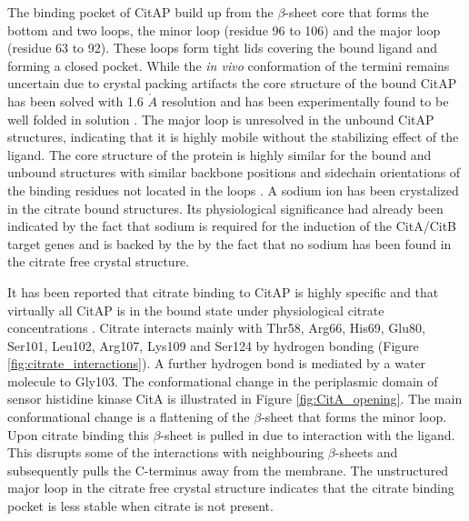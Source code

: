 \documentclass[english, a4paper, 12pt, titlepage, draft]{article}
\begin{document}
The binding pocket of CitAP build up from the $\beta$-sheet core that forms the bottom and two loops, the minor loop (residue 96 to 106) and the major loop (residue 63 to 92).
These loops form tight lids covering the bound ligand and forming a closed pocket.
While the \textit{in vivo} conformation of the termini remains uncertain due to crystal packing artifacts the core structure of the bound CitAP has been solved with 1.6 $\mathring{A}$ resolution and has been experimentally found to be well folded in solution \cite{CitA_2J80}.
The major loop is unresolved in the unbound CitAP structures, indicating that it is highly mobile without the stabilizing effect of the ligand.
The core structure of the protein is highly similar for the bound and unbound structures with similar backbone positions and sidechain orientations of the binding residues not located in the loops \cite{CitA_2J80}.
A sodium ion has been crystalized in the citrate bound structures.
Its physiological significance had already been indicated by the fact that sodium is required for the induction of the CitA/CitB target genes \cite{KlebsiellaMetabolism} and is backed by the by the fact that no sodium has been found in the citrate free crystal structure.

It has been reported that citrate binding to CitAP is highly specific and that virtually all CitAP is in the bound state under physiological citrate concentrations \cite{CitA_2J80}.
Citrate interacts mainly with Thr58, Arg66, His69, Glu80, Ser101, Leu102, Arg107, Lys109 and Ser124 by hydrogen bonding (Figure \ref{fig:citrate_interactions}).
A further hydrogen bond is mediated by a water molecule to Gly103.
The conformational change in the periplasmic domain of sensor histidine kinase CitA is illustrated in Figure \ref{fig:CitA_opening}.
The main conformational change is a flattening of the $\beta$-sheet that forms the minor loop.
Upon citrate binding this $\beta$-sheet is pulled in due to interaction with the ligand.
This disrupts some of the interactions with neighbouring $\beta$-sheets and subsequently pulls the C-terminus away from the membrane.
The unstructured major loop in the citrate free crystal structure indicates that the citrate binding pocket is less stable when citrate is not present.
\end{document}
